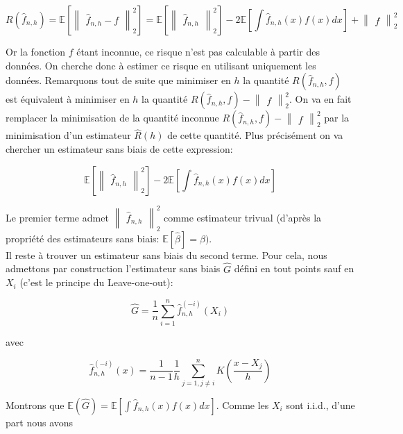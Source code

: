 \documentclass[
]{article}
\begin{document}
\[
  R(\hat {f}_{n,h})=\mathbb{E}[\begin{Vmatrix}\hat {f}_{n,h}-f\end{Vmatrix}_2^2] = \mathbb{E}[\begin{Vmatrix}\hat {f}_{n,h}\end{Vmatrix}_2^2] -2\mathbb{E}[\int \hat {f}_{n,h}(x)f(x)dx] +\begin{Vmatrix}f\end{Vmatrix}_2^2
\]

Or la fonction \(f\) étant inconnue, ce risque n'est pas calculable à
partir des données. On cherche donc à estimer ce risque en utilisant
uniquement les données. Remarquons tout de suite que minimiser en \(h\)
la quantité \(R(\hat {f}_{n,h}, f)\) est équivalent à minimiser en \(h\)
la quantité \(R(\hat {f}_{n,h}, f)-\begin{Vmatrix}f\end{Vmatrix}_2^2\).
On va en fait remplacer la minimisation de la quantité inconnue
\(R(\hat {f}_{n,h}, f)-\begin{Vmatrix}f\end{Vmatrix}_2^2\) par la
minimisation d'un estimateur \(\hat {R}(h)\) de cette quantité. Plus
précisément on va chercher un estimateur sans biais de cette expression:

\[
  \mathbb{E}[\begin{Vmatrix}\hat {f}_{n,h}\end{Vmatrix}_2^2] -2\mathbb{E}[\int \hat {f}_{n,h}(x)f(x)dx]
\]

Le premier terme admet
\(\begin{Vmatrix}\hat {f}_{n,h}\end{Vmatrix}_2^2\) comme estimateur
trivual (d'après la propriété des estimateurs sans biais:
\(\mathbb{E}[\hat {\beta}]=\beta)\).\\
Il reste à trouver un estimateur sans biais du second terme. Pour cela,
nous admettons par construction l'estimateur sans biais \(\hat {G}\)
défini en tout points sauf en \(X_i\) (c'est le principe du
Leave-one-out):

\[
  \hat {G} = \frac{1}{n}\sum_{i=1}^n\hat {f}_{n,h}^{(-i)}(X_i)
\]

avec

\[
  \hat {f}_{n,h}^{(-i)}(x)= \frac{1}{n-1}\frac{1}{h}\sum_{j=1,j\ne i}^nK(\frac{x-X_j}{h})
\]

Montrons que
\(\mathbb{E}(\hat {G})=\mathbb{E}[\int \hat {f}_{n,h}(x)f(x)dx]\). Comme
les \(X_i\) sont i.i.d., d'une part nous avons
\end{document}
